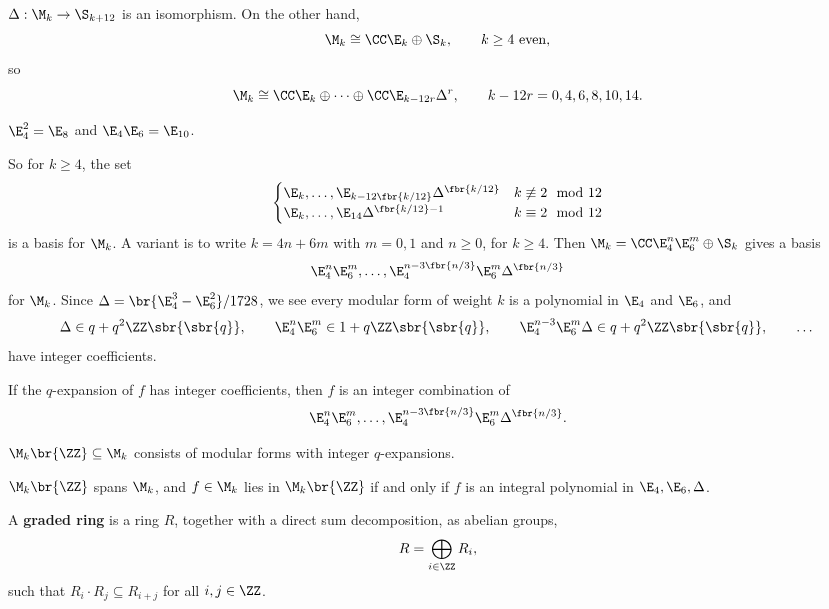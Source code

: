 \begin{corollary}
$ \Delta : \M_k \to \S_{k + 12} $ is an isomorphism. On the other hand,
$$ \M_k \cong \CC\E_k \oplus \S_k, \qquad k \ge 4 \ \text{even}, $$
so
$$ \M_k \cong \CC\E_k \oplus \dots \oplus \CC\E_{k - 12r}\Delta^r, \qquad k - 12r = 0, 4, 6, 8, 10, 14. $$
\end{corollary}

\begin{corollary}
$ \E_4^2 = \E_8 $ and $ \E_4\E_6 = \E_{10} $.
\end{corollary}


So for $ k \ge 4 $, the set
$$
\begin{cases}
\E_k, \dots, \E_{k - 12\fbr{k / 12}}\Delta^{\fbr{k / 12}} & k \not\equiv 2 \mod 12 \\
\E_k, \dots, \E_{14}\Delta^{\fbr{k / 12} - 1} & k \equiv 2 \mod 12
\end{cases}
$$
is a basis for $ \M_k $. A variant is to write $ k = 4n + 6m $ with $ m = 0, 1 $ and $ n \ge 0 $, for $ k \ge 4 $. Then $ \M_k = \CC\E_4^n\E_6^m \oplus \S_k $ gives a basis
$$ \E_4^n\E_6^m, \dots, \E_4^{n - 3\fbr{n / 3}}\E_6^m\Delta^{\fbr{n / 3}} $$
for $ \M_k $. Since $ \Delta = \br{\E_4^3 - \E_6^2} / 1728 $, we see every modular form of weight $ k $ is a polynomial in $ \E_4 $ and $ \E_6 $, and
$$ \Delta \in q + q^2\ZZ\sbr{\sbr{q}}, \qquad \E_4^n\E_6^m \in 1 + q\ZZ\sbr{\sbr{q}}, \qquad \E_4^{n - 3}\E_6^m\Delta \in q + q^2\ZZ\sbr{\sbr{q}}, \qquad \dots $$
have integer coefficients.

\begin{corollary}
If the $ q $-expansion of $ f $ has integer coefficients, then $ f $ is an integer combination of
$$ \E_4^n\E_6^m, \dots, \E_4^{n - 3\fbr{n / 3}}\E_6^m\Delta^{\fbr{n / 3}}. $$
\end{corollary}

\begin{notation*}
$ \M_k\br{\ZZ} \subseteq \M_k $ consists of modular forms with integer $ q $-expansions.
\end{notation*}

\begin{theorem}
$ \M_k\br{\ZZ} $ spans $ \M_k $, and $ f \in \M_k $ lies in $ \M_k\br{\ZZ} $ if and only if $ f $ is an integral polynomial in $ \E_4, \E_6, \Delta $.
\end{theorem}

\begin{definition}
A \textbf{graded ring} is a ring $ R $, together with a direct sum decomposition, as abelian groups,
$$ R = \bigoplus_{i \in \ZZ} R_i, $$
such that $ R_i \cdot R_j \subseteq R_{i + j} $ for all $ i, j \in \ZZ $.
\end{definition}

